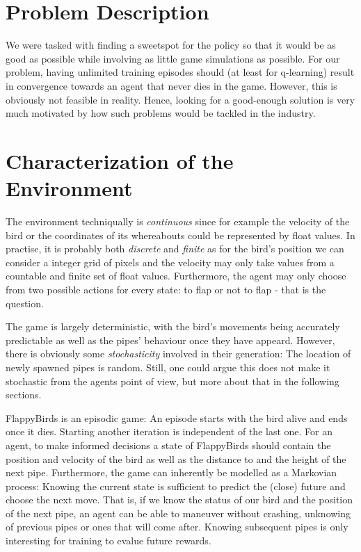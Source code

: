 \documentclass[a4paper,12pt]{article}
\begin{document}
\section{Problem Description}
We were tasked with finding a sweetspot for the policy so that it would be as good as possible while involving as 
little game simulations as
possible. For our problem, having unlimited training episodes should (at least for q-learning) result in convergence towards an agent 
that never dies in the game.
However, this is obviously not feasible in reality. Hence, looking for a good-enough solution is very much motivated by
how such problems would be tackled in the industry.

\section{Characterization of the Environment}
The environment techniqually is \textit{continuous} since for example the velocity of the bird or the coordinates of its whereabouts
could be represented by float values. In practise, it is probably both \textit{discrete} and \textit{finite} as for the bird's position we can consider a 
integer grid of pixels and the velocity may only take values from a countable and finite set of float values. Furthermore, the agent
may only choose from two possible actions for every state: to flap or not to flap - that is the question.

The game is largely deterministic, with the bird's movements being accurately predictable as well as the pipes' behaviour once they have
appeard.
However, there is obviously some \textit{stochasticity} involved in their generation: 
The location of newly spawned pipes is random. Still, one could argue
this does not make it stochastic from the agents point of view, but more about that in the following sections.

FlappyBirds is an episodic game: An episode starts with the bird alive and ends once it dies. Starting another iteration is independent
of the last one.
For an agent, to make informed decisions a state of FlappyBirds should contain the position and velocity of the bird as well as the distance to
and the height of the next pipe.
Furthermore, the game can inherently be modelled as a Markovian process: Knowing the current state is sufficient to predict the (close) future
and choose the next move. That is, if we know the status of our bird and the position of the next pipe, an agent can be able
to maneuver without crashing, unknowing of previous pipes or ones that will come after. Knowing subsequent pipes is only 
interesting for training to evalue future rewards.
\end{document}
